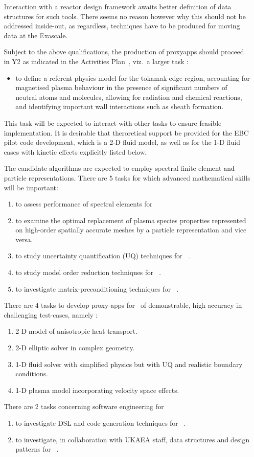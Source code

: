 Interaction with a reactor design framework awaits better definition of data structures
for such tools. There seems no reason however why this should not be addressed inside-out,
as regardless, techniques have to be produced for moving data at the Exascale.

Subject to the above qualifications, the production of proxyapps should proceed in Y2 as indicated
in the Activities Plan~\cite{y12acts}, viz.\ a larger task :
\begin{itemize}
\item to define a referent physics model for the tokamak edge region, accounting
for magnetised plasma behaviour in the presence of significant numbers of neutral atoms and molecules, allowing for
radiation and chemical reactions, and identifying important wall interactions such as sheath formation.
\end{itemize}
This task will be expected to interact with other tasks to ensure feasible implementation.
It is desirable that theroretical support be provided for the EBC pilot code development,
which is a 2-D fluid model, as well as for the 1-D fluid cases with kinetic effects explicitly
listed below.

The candidate algorithms are expected to employ spectral finite element and particle representations.
There are 5 tasks for which advanced mathematical skills will be important:
\begin{enumerate}
\item  to assess performance of spectral elements for \nep \ 
\item  to examine the optimal replacement of plasma species properties
represented on high-order spatially accurate meshes by a particle representation and vice versa.
\item  to study uncertainty quantification (UQ) techniques for \nep \ .
\item  to study model order reduction techniques for \nep \ .
\item  to investigate matrix-preconditioning techniques for \nep \ .
\end{enumerate}
There are 4 tasks to develop proxy-apps for \nep \  of demonstrable, high accuracy
in challenging test-cases, namely :
\begin{enumerate}
\item  2-D model of anisotropic heat transport.
\item  2-D elliptic solver in complex geometry.
\item  1-D fluid solver with simplified physics but with UQ and realistic boundary conditions.
\item  1-D plasma model incorporating velocity space effects.
\end{enumerate}
There are 2  tasks concerning software engineering for \nep \ 
\begin{enumerate}
\item  to investigate DSL and code generation techniques for \nep \ .
\item  to investigate, in collaboration with UKAEA staff, data structures and design patterns for \nep \ .
\end{enumerate}

